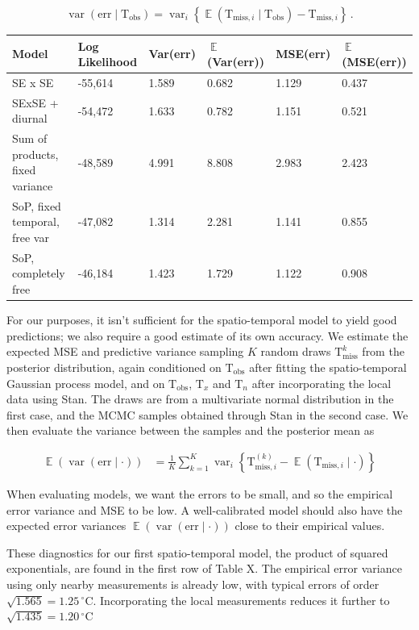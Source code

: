 \documentclass[letter]{article}
\newcommand{\genericdel}[3]{%
      \left#1#3\right#2
    }
\newcommand{\del}[1]{\genericdel(){#1}}
\newcommand{\cbr}[1]{\genericdel\{\}{#1}}
\DeclareMathOperator{\E}{\mathbb{E}}
\DeclareMathOperator{\var}{{var}}
\newcommand{\T}{\mathrm{T}}
\newcommand{\Tn}{\T_{n}}
\newcommand{\Tx}{\T_{x}}
\newcommand{\degreeC}{^\circ \mathrm{C}}
\newcommand{\miss}{\mathrm{miss}}
\newcommand{\obs}{\mathrm{obs}}
\newcommand{\error}{\mathrm{err}}
\begin{document}
\begin{equation}
    \label{eq:varerr}
    \var\del{\error \mid \T_\obs} = \var_i \cbr{\E\del{\T_{\miss,i} \mid \T_\obs} - \T_{\miss,i}}\,.
\end{equation}

\begin{longtable}[]{@{}llllll@{}}
\toprule
Model & Log Likelihood & Var(err) & \(\E\)(Var(err)) & MSE(err) &
\(\E\)(MSE(err))\tabularnewline
\midrule
\endhead
SE x SE & -55,614 & 1.589 & 0.682 & 1.129 & 0.437\tabularnewline
SExSE + diurnal & -54,472 & 1.633 & 0.782 & 1.151 & 0.521\tabularnewline
Sum of products, fixed variance & -48,589 & 4.991 & 8.808 & 2.983 &
2.423\tabularnewline
SoP, fixed temporal, free var & -47,082 & 1.314 & 2.281 & 1.141 &
0.855\tabularnewline
SoP, completely free & -46,184 & 1.423 & 1.729 & 1.122 &
0.908\tabularnewline
\bottomrule
\end{longtable}

For our purposes, it isn't sufficient for the spatio-temporal model to
yield good predictions; we also require a good estimate of its own
accuracy. We estimate the expected MSE and predictive variance sampling
\(K\) random draws \(\T^k_\miss\) from the posterior distribution, again
conditioned on \(\T_\obs\) after fitting the spatio-temporal Gaussian
process model, and on \(\T_\obs\), \(\Tx\) and \(\Tn\) after
incorporating the local data using Stan. The draws are from a
multivariate normal distribution in the first case, and the MCMC samples
obtained through Stan in the second case. We then evaluate the variance
between the samples and the posterior mean as

\begin{align}
    \E \del{\var\del{\error \mid \cdot}} &= \frac{1}{K} \sum_{k=1}^K \var_i \cbr{\T^{(k)}_{\miss,i} - \E\del{\T_{\miss,i} \mid \cdot}}
\end{align}

When evaluating models, we want the errors to be small, and so the
empirical error variance and MSE to be low. A well-calibrated model
should also have the expected error variances
\(\E \del{\var\del{\error \mid \cdot}}\) close to their empirical
values.

These diagnostics for our first spatio-temporal model, the product of
squared exponentials, are found in the first row of Table X. The
empirical error variance using only nearby measurements is already low,
with typical errors of order \(\sqrt{1.565}=1.25\,\degreeC\).
Incorporating the local measurements reduces it further to
\(\sqrt{1.435}=1.20\,\degreeC\)
    
\end{document}
